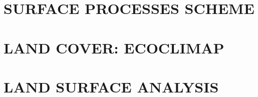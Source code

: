 \documentclass[11pt]{book}
\begin{document}
\part{SURFACE PROCESSES SCHEME}







\part{LAND COVER: ECOCLIMAP}


\part{LAND SURFACE ANALYSIS}


%
%
\end{document}
